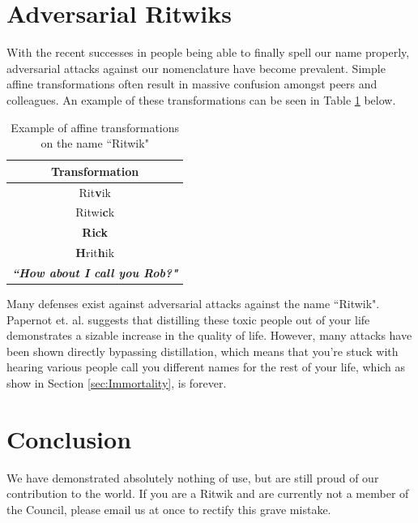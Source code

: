 \documentclass[]{article}
\begin{document}
\section{Adversarial Ritwiks}
With the recent successes in people being able to finally spell our name properly, adversarial attacks against our nomenclature have become prevalent. Simple affine transformations often result in massive confusion amongst peers and colleagues. An example of these transformations can be seen in Table \ref{table:affineadversarial} below.
\begin{table}[h]
\centering
\begin{tabular}{|c|}
	\hline 
	\textbf{Transformation}\\ 
	\hline 
	Rit\textbf{v}ik\\ 
	\hline 
	Ritwi\textbf{c}k\\
	\hline
	\textbf{Rick}\\
	\hline
	\textbf{H}rit\textbf{h}ik\\
	\hline
	\textbf{\textit{``How about I call you Rob?"}}\\
	\hline
\end{tabular}
\caption{Example of affine transformations on the name ``Ritwik"}
\label{table:affineadversarial}
\end{table}
Many defenses exist against adversarial attacks against the name ``Ritwik". Papernot et. al. \cite{Papernot} suggests that distilling these toxic people out of your life demonstrates a sizable increase in the quality of life. However, many attacks have been shown directly bypassing distillation, which means that you're stuck with hearing various people call you different names for the rest of your life, which as show in Section \ref{sec:Immortality}, is forever.

\section{Conclusion}
We have demonstrated absolutely nothing of use, but are still proud of our contribution to the world. If you are a Ritwik and are currently not a member of the Council, please email us at once to rectify this grave mistake.



\end{document}

